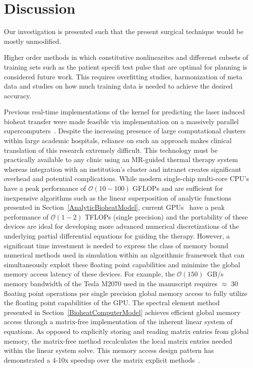 \documentclass[12pt]{article}
\begin{document}
\section{Discussion}
{\color{red}
Our investigation is presented such that the present surgical
technique would be mostly unmodified. 

Higher order methods in which constitutive nonlinearites and differenst
subsets of training sets such as the patient specifi
test pulse that are optimal for planning
is considered future work. This requires overfitting studies, harmonization
of meta data and studies on how much training data is needed to achieve
the desired accuracy.

Previous real-time implementations of the kernel for
predicting the laser induced bioheat transfer were made feasible via
implementation on a massively parallel supercomputers~\cite{fuentesetal09,
Odenetal07,Dilleretal07,Fengetal07,Fuentesetal08}. 
Despite the increasing presence of large computational clusters within
large academic hospitals, reliance on such an approach makes clinical
translation of this research extremely difficult. This technology must
be practically available to any clinic using an MR-guided thermal therapy
system whereas integration with an institution's cluster and intranet creates
significant overhead and potential complications.
While modern single-chip multi-core CPU's have a peak performance of
$\mathcal{O}(10-100)$ GFLOPs and are sufficient 
for inexpensive algorithms such as the linear superposition of analytic functions presented
in Section~\ref{AnalyticBioheatModel}, 
current GPUs~\cite{Farber2011a,Muller2013} have a peak
performance of $\mathcal{O}(1-2)$ TFLOPs (single precision) and the
portability of these devices are ideal for developing more advanced 
numerical discretizations of the underlying partial differential equations
for guiding the therapy. However, a significant
time investment is needed to express the class of memory bound numerical
methods used in simulation within an algorithmic framework that can
simultaneously exploit these floating point capabilities and minimize the
global memory access latency of these devices.
For example, the $\mathcal{O} (150)$~GB/s memory bandwidth of the Tesla M2070
used in the manuscript requires $\approx$ 30 floating point operations per
single precision global memory access to fully utilize the floating point capabilities
of the GPU. 
The spectral element method presented in Section~\ref{BioheatComputerModel}
achieves efficient global memory access through a matrix-free
implementation of the inherent linear system of equations.
As opposed to explicitly storing and reading matrix entries
from global memory, the matrix-free method recalculates the local matrix entries
needed within the linear system solve.
This memory access design pattern has demonstrated a 4-10x speedup  over
the matrix explicit methods~\cite{Muller2013,Knepley_2_2013,Medina2014}.

}
\end{document}
